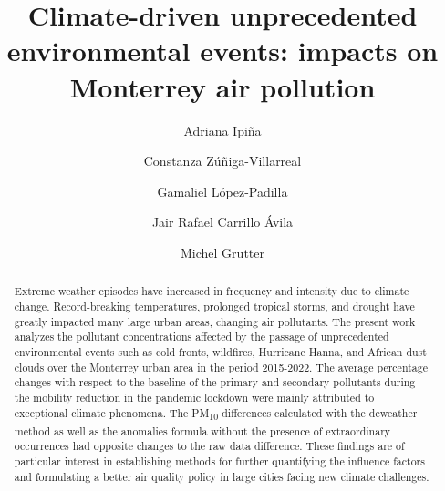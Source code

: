 \documentclass[preprint,12pt]{elsarticle}
\begin{document}
\begin{frontmatter}
	\title{
		Climate-driven unprecedented environmental events: impacts on Monterrey air pollution
	}
	\author[1]{Adriana Ipiña}
	\author[2]{Constanza Zúñiga-Villarreal}
	\author[3]{Gamaliel López-Padilla}
	\author[4]{Jair Rafael Carrillo Ávila}
	\author[5]{Michel Grutter}
	\vspace{-1em}
	\begin{abstract}
		Extreme weather episodes have increased in frequency and intensity due to climate change. Record-breaking temperatures, prolonged tropical storms, and drought have greatly impacted many large urban areas, changing air pollutants. The present work analyzes the pollutant concentrations affected by the passage of unprecedented environmental events such as cold fronts, wildfires, Hurricane Hanna, and African dust clouds over the Monterrey urban area in the period 2015-2022. The average percentage changes with respect to the baseline of the primary and secondary pollutants during the mobility reduction in the pandemic lockdown were mainly attributed to exceptional climate phenomena. The PM\textsubscript{10} differences calculated with the deweather method as well as the anomalies formula without the presence of extraordinary occurrences had opposite changes to the raw data difference. These findings are of particular interest in establishing methods for further quantifying the influence factors and formulating a better air quality policy in large cities facing new climate challenges.

\end{abstract}
\end{frontmatter}
\end{document}
